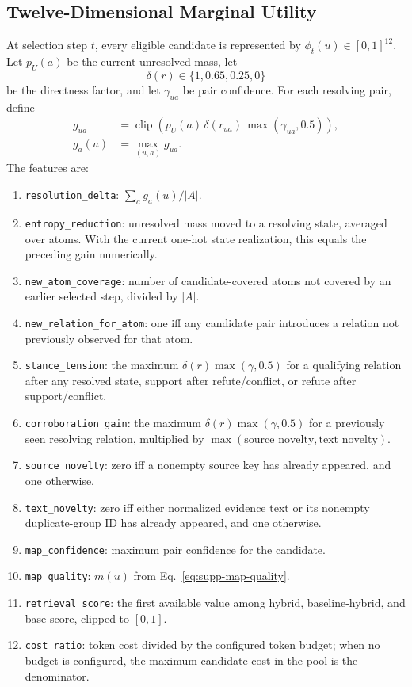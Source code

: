 \subsection{Twelve-Dimensional Marginal Utility}
\label{supp:marginal-features}

At selection step \(t\), every eligible candidate is represented by
\(\phi_t(u)\in[0,1]^{12}\).  Let \(p_U(a)\) be the current unresolved mass,
let
\[
\delta(r)\in\{1,0.65,0.25,0\}
\]
be the directness factor, and let \(\gamma_{ua}\) be pair confidence.  For
each resolving pair, define
\[
\begin{aligned}
g_{ua}&=\operatorname{clip}\!\left(
p_U(a)\,\delta(r_{ua})\,
\max(\gamma_{ua},0.5)\right),\\
g_a(u)&=\max_{(u,a)}g_{ua}.
\end{aligned}
\]
The features are:

\begin{enumerate}
\item \texttt{resolution\_delta}:
  \(\sum_a g_a(u)/|A|\).
\item \texttt{entropy\_reduction}: unresolved mass moved to a resolving
  state, averaged over atoms.  With the current one-hot state realization,
  this equals the preceding gain numerically.
\item \texttt{new\_atom\_coverage}: number of candidate-covered atoms not
  covered by an earlier selected step, divided by \(|A|\).
\item \texttt{new\_relation\_for\_atom}: one iff any candidate pair introduces
  a relation not previously observed for that atom.
\item \texttt{stance\_tension}: the maximum
  \(\delta(r)\max(\gamma,0.5)\) for a qualifying relation after any resolved
  state, support after refute/conflict, or refute after support/conflict.
\item \texttt{corroboration\_gain}: the maximum
  \(\delta(r)\max(\gamma,0.5)\) for a previously seen resolving relation,
  multiplied by \(\max(\text{source novelty},\text{text novelty})\).
\item \texttt{source\_novelty}: zero iff a nonempty source key has already
  appeared, and one otherwise.
\item \texttt{text\_novelty}: zero iff either normalized evidence text or its
  nonempty duplicate-group ID has already appeared, and one otherwise.
\item \texttt{map\_confidence}: maximum pair confidence for the candidate.
\item \texttt{map\_quality}: \(m(u)\) from
  Eq.~\eqref{eq:supp-map-quality}.
\item \texttt{retrieval\_score}: the first available value among hybrid,
  baseline-hybrid, and base score, clipped to \([0,1]\).
\item \texttt{cost\_ratio}: token cost divided by the configured token budget;
  when no budget is configured, the maximum candidate cost in the pool is
  the denominator.
\end{enumerate}


